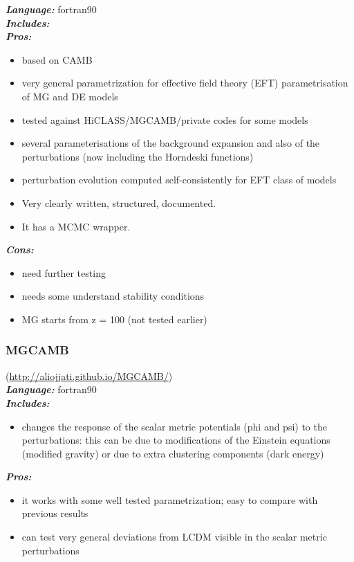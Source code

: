 {\it \bf Language:} fortran90\\

{\it \bf Includes:}\\

{\it \bf Pros:}
\begin{itemize}
 \item based on CAMB
 \item very general parametrization for effective field theory (EFT) parametrisation of MG and DE models
 \item tested against HiCLASS/MGCAMB/private codes for some models
 \item several parameterisations of the background expansion and also of the perturbations (now including the Horndeski functions)
 \item perturbation evolution computed self-consistently for EFT class of models
 \item Very clearly written, structured, documented. 
 \item It has a MCMC wrapper.
\end{itemize}

{\it \bf Cons: }
\begin{itemize}
 \item need further testing
 \item needs some understand stability conditions
 \item MG starts from z = 100 (not tested earlier)
\end{itemize}

\newpage
\subsubsection{MGCAMB}(\url{http://aliojjati.github.io/MGCAMB/})\\

{\it \bf Language:} fortran90\\

{\it \bf Includes: }
\begin{itemize}
 \item changes the response of the scalar metric potentials (phi and psi) to the perturbations: this can be due to modifications of the Einstein equations 
 (modified gravity) or due to extra clustering components (dark energy)
\end{itemize}

{\it \bf Pros: }
\begin{itemize}
 \item it works with some well tested parametrization; easy to compare with previous results 
 \item can test  very general deviations from LCDM visible in the scalar metric perturbations
\end{itemize}

